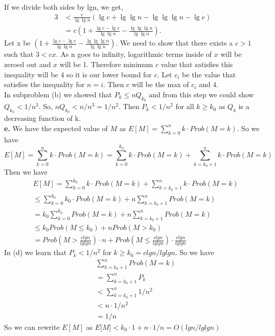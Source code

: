 \documentclass{article}
\begin{document}
If we divide both sides by lgn, we get, 
\begin{align*}
3 &< \frac{c}{\lg\lg n}(\lg c + \lg\lg n - \lg\lg\lg n - \lg e) \\
&= c(1 + \frac{\lg c - \lg e}{\lg\lg n} - \frac{\lg\lg\lg n}{\lg\lg n}).
\end{align*}
 Let x be $(1 + \frac{\lg c - \lg e}{\lg\lg n} - \frac{\lg\lg\lg n}{\lg\lg n})$. We need to show that there exists a $c > 1$ such that $3 < cx$. As n goes to infinity, logarithmic terms inside of $x$ will be zeroed out and $x$ will be 1. Therefore minimum $c$ value that satisfies this inequality will be 4 so it is our lower bound for $c$. Let $c_i$ be the value that satisfies the inequality for $n = i$. Then c will be the max of $c_i$ and 4. \\
In subproblem (b) we showed that $P_k \leq nQ_{k_0}$ and from this step we could show $Q_{k_0} < 1/n^3$. So, $nQ_{k_0} < n/n^3 = 1/n^2$. Then $P_k < 1/n^2$ for all $k \geq k_0$ as $Q_k$ is a decreasing function of k.  \\ \newline
\textbf{e.} We have the expected value of $M$ as 
$E[M] = \sum_{k=0}^nk\cdot Prob(M = k)$. So we have 
$$E[M] = \sum_{k=0}^nk\cdot Prob(M = k) = \sum_{k = 0}^{k_{0}}k\cdot Prob(M = k) + \sum_{k = k_0+1}^nk\cdot Prob(M = k)$$
Then we have 
\begin{align*}
&E[M]=\sum_{k = 0}^{k_{0}}k\cdot Prob(M = k) + \sum_{k = k_0+1}^nk\cdot Prob(M = k) \\
&\leq \sum_{k = 0}^{k_{0}}k_0\cdot Prob(M = k) + n\sum_{k = k_0+1}^nProb(M = k)\\
&= k_0\sum_{k = 0}^{k_{0}}Prob(M = k) + n\sum_{k = k_0+1}^nProb(M = k)\\
&\leq k_0Prob(M \leq k_0) + nProb(M > k_0)\\
&= Prob(M > \frac{clgn}{lglgn})\cdot n + Prob(M\leq \frac{clgn}{lglgn})\cdot \frac{clgn}{lglgn}
\end{align*}
In (d) we learn that $P_k < 1/n^2$ for $k \geq k_0 = clgn/lglgn$. So we have
\begin{align*}
&\sum_{k = k_0+1}^nProb(M = k) \\
&=\sum_{k = k_0+1}^nP_k \\
&< \sum_{k = k_0+1}^n1/n^2 \\
&< n\cdot 1/n^2\\
&=1/n
\end{align*}
So we can rewrite $E[M]$ as $E]M] < k_0 \cdot 1 + n\cdot 1/n = O(lgn/lglgn)$
\end{document}

